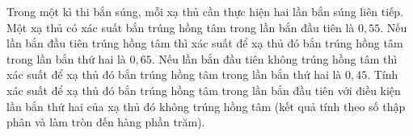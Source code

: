 \begin{ex}
Trong một kì thi bắn súng, mỗi xạ thủ cần thực hiện hai lần bắn súng liên tiếp. Một xạ thủ có xác suất bắn trúng hồng tâm trong lần bắn đầu tiên là $0{,}55$. Nếu lần bắn đầu tiên trúng hồng tâm thì xác suất để xạ thủ đó bắn trúng hồng tâm trong lần bắn thứ hai là $0{,}65$. Nếu lần bắn đầu tiên không trúng hồng tâm thì xác suất để xạ thủ đó bắn trúng hồng tâm trong lần bắn thứ hai là $0{,}45$. Tính xác suất để xạ thủ đó bắn trúng hồng tâm trong lần bắn đầu tiên với điều kiện lần bắn thứ hai của xạ thủ đó không trúng hồng tâm (kết quả tính theo số thập phân và làm tròn đến hàng phần trăm).
\end{ex}
